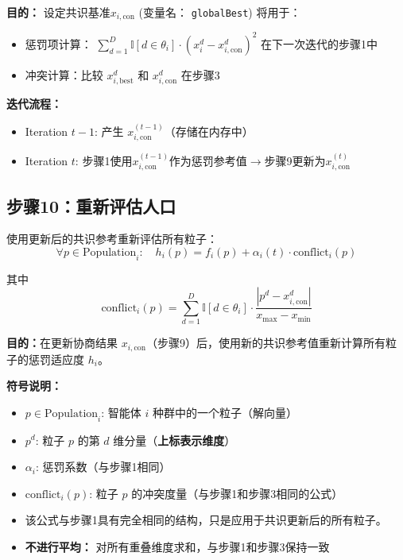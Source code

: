 \documentclass[11pt,a3paper]{ctexart}
\begin{document}
\textbf{目的：} 设定共识基准$x_{i,\text{con}}$ (变量名： \texttt{globalBest}) 将用于：
\begin{itemize}
    \item 惩罚项计算： $\sum_{d=1}^{D} \mathbb{I}[d \in \theta_i] \cdot (x_i^d - x_{i,\text{con}}^d)^2$ 在下一次迭代的步骤1中
    \item 冲突计算：比较 $x_{i,\text{best}}^d$ 和 $x_{i,\text{con}}^d$ 在步骤3
\end{itemize}

\textbf{迭代流程：}
\begin{itemize}
    \item Iteration $t-1$: 产生 $x_{i,\text{con}}^{(t-1)}$（存储在内存中）
    \item Iteration $t$: 步骤1使用$x_{i,\text{con}}^{(t-1)}$作为惩罚参考值$\to$步骤9更新为$x_{i,\text{con}}^{(t)}$
\end{itemize}

\subsection{步骤10：重新评估人口}
使用更新后的共识参考重新评估所有粒子：
\begin{equation}
\forall p \in \text{Population}_i: \quad h_i(p) = f_i(p) + \alpha_i(t) \cdot \text{conflict}_i(p)
\end{equation}

其中
\begin{equation}
\text{conflict}_i(p) = \sum_{d=1}^{D} \mathbb{I}[d \in \theta_i] \cdot \frac{|p^d - x_{i,\text{con}}^d|}{x_{\max} - x_{\min}}
\end{equation}

\textbf{目的：}在更新协商结果 $x_{i,\text{con}}$（步骤9）后，使用新的共识参考值重新计算所有粒子的惩罚适应度 $h_i$。

\textbf{符号说明：}
\begin{itemize}
    \item $p \in \text{Population}_i$: 智能体 $i$ 种群中的一个粒子（解向量）
    \item $p^d$: 粒子 $p$ 的第 $d$ 维分量（\textbf{上标表示维度}）
    \item $\alpha_i$: 惩罚系数（与步骤1相同）
    \item $\text{conflict}_i(p)$: 粒子 $p$ 的冲突度量（与步骤1和步骤3相同的公式）
    \item 该公式与步骤1具有完全相同的结构，只是应用于共识更新后的所有粒子。
    \item \textbf{不进行平均：} 对所有重叠维度求和，与步骤1和步骤3保持一致
\end{itemize}
\end{document}
